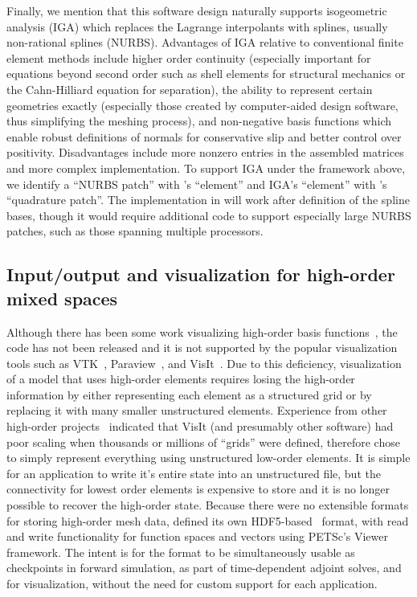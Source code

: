Finally, we mention that this software design naturally supports isogeometric analysis (IGA) \citep{cottrell2009isogeometric} which replaces the Lagrange interpolants with splines, usually non-rational splines (NURBS).
Advantages of IGA relative to conventional finite element methods include higher order continuity (especially important for equations beyond second order such as shell elements for structural mechanics or the Cahn-Hilliard equation for separation), the ability to represent certain geometries exactly (especially those created by computer-aided design software, thus simplifying the meshing process), and non-negative basis functions which enable robust definitions of normals for conservative slip and better control over positivity.
Disadvantages include more nonzero entries in the assembled matrices and more complex implementation.
To support IGA under the framework above, we identify a ``NURBS patch'' with \Dohp's ``element'' and IGA's ``element'' with \Dohp's ``quadrature patch''.
The implementation in {\Dohp} will work after definition of the spline bases, though it would require additional code to support especially large NURBS patches, such as those spanning multiple processors.

\subsection{Input/output and visualization for high-order mixed spaces}
Although there has been some work visualizing high-order basis functions~\citep{schroeder2005framework,schroeder2006methods,ueffinger2010interactive}, the code has not been released and it is not supported by the popular visualization tools such as VTK~\citep{schroeder1998visualization}, Paraview~\citep{henderson2004paraview}, and VisIt~\citep{childs2006beyond}.
Due to this deficiency, visualization of a model that uses high-order elements requires losing the high-order information by either representing each element as a structured grid or by replacing it with many smaller unstructured elements.
Experience from other high-order projects~\citep{fischer2008nek5000} indicated that VisIt (and presumably other software) had poor scaling when thousands or millions of ``grids'' were defined, therefore {\Dohp} chose to simply represent everything using unstructured low-order elements.
It is simple for an application to write it's entire state into an unstructured file, but the connectivity for lowest order elements is expensive to store and it is no longer possible to recover the high-order state.
Because there were no extensible formats for storing high-order mesh data, {\Dohp} defined its own HDF5-based~\citep{hdf5} format, with read and write functionality for function spaces and vectors using PETSc's Viewer framework.
The intent is for the format to be simultaneously usable as checkpoints in forward simulation, as part of time-dependent adjoint solves, and for visualization, without the need for custom support for each application.

